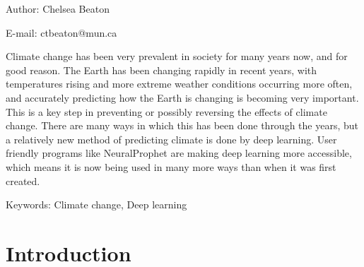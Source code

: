 \documentclass[11pt,a4paper,fleqn]{article}
\begin{document}
\par{}

\vspace{6mm}\par\noindent{\bf

}


\vspace{6mm}\par\noindent
Author: Chelsea Beaton \par\noindent
E-mail: ctbeaton@mun.ca


\vspace{9mm}\par\noindent\hspace*{8mm}\parbox{140mm}{\small{}
Climate change has been very prevalent in society for many years now, and for good reason. The Earth has been changing rapidly in recent years, with temperatures rising and more extreme weather conditions occurring more often, and accurately predicting how the Earth is changing is becoming very important. This is a key step in preventing or possibly reversing the effects of climate change. There are many ways in which this has been done through the years, but a relatively new method of predicting climate is done by deep learning. User friendly programs like NeuralProphet are making deep learning more accessible, which means it is now being used in many more ways than when it was first created.
}\par\vspace{5mm}


Keywords:
Climate change,
Deep learning


\section{Introduction}
\end{document}
